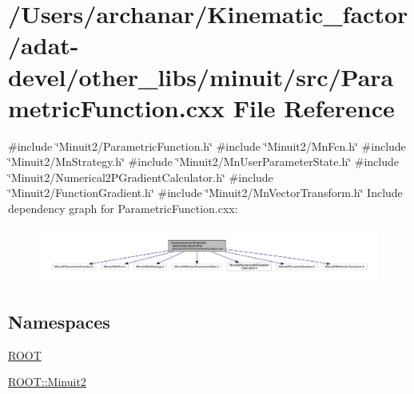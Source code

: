 \hypertarget{adat-devel_2other__libs_2minuit_2src_2ParametricFunction_8cxx}{}\section{/\+Users/archanar/\+Kinematic\+\_\+factor/adat-\/devel/other\+\_\+libs/minuit/src/\+Parametric\+Function.cxx File Reference}
\label{adat-devel_2other__libs_2minuit_2src_2ParametricFunction_8cxx}
{\ttfamily \#include \char`\"{}Minuit2/\+Parametric\+Function.\+h\char`\"{}}\newline
{\ttfamily \#include \char`\"{}Minuit2/\+Mn\+Fcn.\+h\char`\"{}}\newline
{\ttfamily \#include \char`\"{}Minuit2/\+Mn\+Strategy.\+h\char`\"{}}\newline
{\ttfamily \#include \char`\"{}Minuit2/\+Mn\+User\+Parameter\+State.\+h\char`\"{}}\newline
{\ttfamily \#include \char`\"{}Minuit2/\+Numerical2\+P\+Gradient\+Calculator.\+h\char`\"{}}\newline
{\ttfamily \#include \char`\"{}Minuit2/\+Function\+Gradient.\+h\char`\"{}}\newline
{\ttfamily \#include \char`\"{}Minuit2/\+Mn\+Vector\+Transform.\+h\char`\"{}}\newline
Include dependency graph for Parametric\+Function.\+cxx\+:
\nopagebreak
\begin{figure}[H]
\begin{center}
\leavevmode
\includegraphics[width=350pt]{da/dbc/adat-devel_2other__libs_2minuit_2src_2ParametricFunction_8cxx__incl}
\end{center}
\end{figure}
\subsection*{Namespaces}
\begin{DoxyCompactItemize}
\item 
 \mbox{\hyperlink{namespaceROOT}{R\+O\+OT}}
\item 
 \mbox{\hyperlink{namespaceROOT_1_1Minuit2}{R\+O\+O\+T\+::\+Minuit2}}
\end{DoxyCompactItemize}
